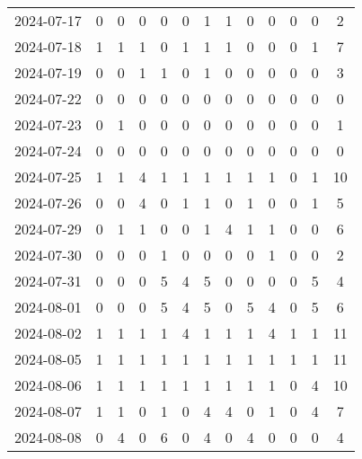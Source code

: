 \documentclass[dvipdfmx,oneside]{article}
\begin{document}
\begin{longtable}{lcccccccccccc}
        2024-07-17 &     0 &     0 &     0 &     0 &     0 &     1 &     1 &     0 &     0 &     0 &     0 &      2 \\
        2024-07-18 &     1 &     1 &     1 &     0 &     1 &     1 &     1 &     0 &     0 &     0 &     1 &      7 \\
        2024-07-19 &     0 &     0 &     1 &     1 &     0 &     1 &     0 &     0 &     0 &     0 &     0 &      3 \\
        2024-07-22 &     0 &     0 &     0 &     0 &     0 &     0 &     0 &     0 &     0 &     0 &     0 &      0 \\
        2024-07-23 &     0 &     1 &     0 &     0 &     0 &     0 &     0 &     0 &     0 &     0 &     0 &      1 \\
        2024-07-24 &     0 &     0 &     0 &     0 &     0 &     0 &     0 &     0 &     0 &     0 &     0 &      0 \\
        2024-07-25 &     1 &     1 &     4 &     1 &     1 &     1 &     1 &     1 &     1 &     0 &     1 &     10 \\
        2024-07-26 &     0 &     0 &     4 &     0 &     1 &     1 &     0 &     1 &     0 &     0 &     1 &      5 \\
        2024-07-29 &     0 &     1 &     1 &     0 &     0 &     1 &     4 &     1 &     1 &     0 &     0 &      6 \\
        2024-07-30 &     0 &     0 &     0 &     1 &     0 &     0 &     0 &     0 &     1 &     0 &     0 &      2 \\
        2024-07-31 &     0 &     0 &     0 &     5 &     4 &     5 &     0 &     0 &     0 &     0 &     5 &      4 \\
        2024-08-01 &     0 &     0 &     0 &     5 &     4 &     5 &     0 &     5 &     4 &     0 &     5 &      6 \\
        2024-08-02 &     1 &     1 &     1 &     1 &     4 &     1 &     1 &     1 &     4 &     1 &     1 &     11 \\
        2024-08-05 &     1 &     1 &     1 &     1 &     1 &     1 &     1 &     1 &     1 &     1 &     1 &     11 \\
        2024-08-06 &     1 &     1 &     1 &     1 &     1 &     1 &     1 &     1 &     1 &     0 &     4 &     10 \\
        2024-08-07 &     1 &     1 &     0 &     1 &     0 &     4 &     4 &     0 &     1 &     0 &     4 &      7 \\
        2024-08-08 &     0 &     4 &     0 &     6 &     0 &     4 &     0 &     4 &     0 &     0 &     0 &      4 \\

\end{longtable}
\end{document}
